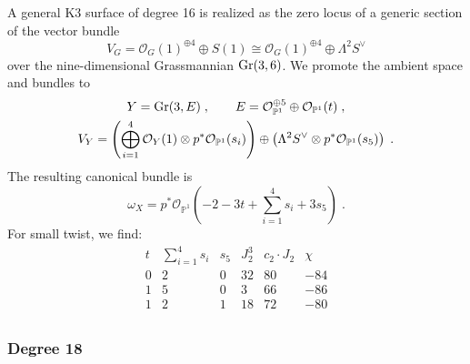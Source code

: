 \documentclass[11pt,a4paper]{article}
\numberwithin{equation}{section}
\numberwithin{table}{section}\setlength{\multlinegap}{25pt}
\begin{document}
A general K3 surface of degree 16 is realized as the zero locus of a generic section of the vector bundle~\cite{Mukai2}
\begin{equation}
    \label{eq:Degree16FiberDefiningBundle}
    V_G=\mathcal{O}_G(1)^{\oplus 4}\oplus S(1)\cong\mathcal{O}_G(1)^{\oplus 4}\oplus\Lambda^2 S^\vee
\end{equation}
over the nine-dimensional Grassmannian $\textup{Gr}(3,6)$. We promote the ambient space and bundles to
\begin{equation}
    \begin{gathered}
    Y = \textup{Gr}(3,E)\;,\qquad E = \mathcal{O}_{\mathbb{P}^1}^{\oplus 5}\oplus \mathcal{O}_{\mathbb{P}^1}(t)\;,\\
    V_Y=\left(\bigoplus_{i=1}^{4}\mathcal{O}_Y(1)\otimes p^*\mathcal{O}_{\mathbb{P}^1}(s_i)\right)\oplus \left(\Lambda^2 S^\vee\otimes p^*\mathcal{O}_{\mathbb{P}^1}(s_5)\right)\;.
    \end{gathered}
\end{equation}
The resulting canonical bundle is
\begin{equation}
    \omega_X=p^*\mathcal{O}_{\mathbb{P}^1}(-2-3t+\textstyle{\sum}_{i=1}^4s_i+3s_5)\;.
\end{equation}
For small twist, we find:
\begin{equation}
    \begin{array}{cccccc}
        t & \textstyle{\sum}_{i=1}^4s_i & s_5 & J_2^3 & c_2\cdot J_2 & \chi\\
        \hline
        0 & 2 & 0 & 32 & 80 & -84\\
        1 & 5 & 0 &  3 & 66 & -86\\
        1 & 2 & 1 & 18 & 72 & -80\\
    \end{array}
\end{equation}

\subsubsection*{Degree 18}
\end{document}
